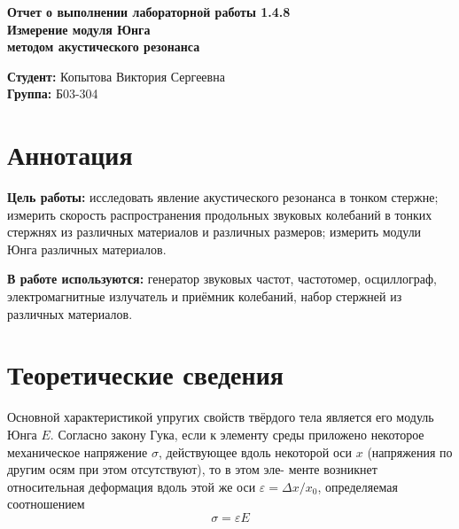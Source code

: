 \documentclass[a4paper,12 pt]{article}
\begin{document}
    \begin{titlepage}
    \begin{center}
        \vspace{4cm}
        \huge {\textbf{Отчет о выполнении лабораторной работы 1.4.8 }}
        {} \\
        \vspace{1cm}
        \Large {\textbf{Измерение модуля Юнга}} \\
        \Large {\textbf{методом акустического резонанса}} \\
        \vspace{10cm}
        \begin{flushright}
        \begin{minipage}{.45\textwidth}
        \normalsize{\textbf{Студент:} Копытова Виктория Сергеевна}\\
        \textbf{Группа:} Б03-304\\
        \end{minipage}
        \end{flushright}   
    \end{center}
    \end{titlepage}
\newpage
 
\section{Аннотация}
\textbf{Цель работы:} исследовать явление акустического резонанса в тонком стержне; измерить скорость распространения продольных звуковых колебаний в тонких стержнях из различных материалов и различных размеров; измерить модули Юнга различных материалов.

\textbf{В работе используются:} генератор звуковых частот, частотомер, осциллограф, электромагнитные излучатель и приёмник колебаний, набор стержней из различных материалов.
	

\section{Теоретические сведения}

Основной характеристикой упругих свойств твёрдого тела является его
модуль Юнга $E$. Согласно закону Гука, если к элементу среды приложено
некоторое механическое напряжение $\sigma$, действующее вдоль некоторой
оси $x$ (напряжения по другим осям при этом отсутствуют), то в этом эле-
менте возникнет относительная деформация вдоль этой же оси
$\varepsilon = \Delta x/x_0$, определяемая соотношением
\begin{equation}
    \sigma = \varepsilon E
\end{equation}
\end{document}
